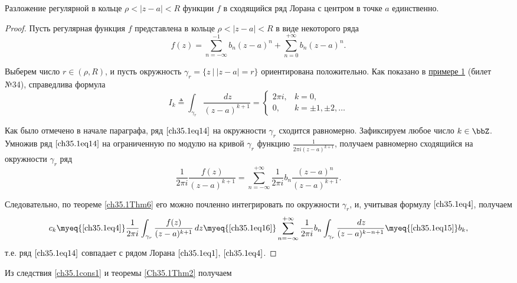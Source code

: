 \begin{thm} \label{Ch35.1Thm2}
Разложение регулярной в кольце $\rho < |z - a| < R$ функции $f$ в сходящийся ряд Лорана с центром в точке $a$ единственно.
\end{thm}

\begin{proof}
Пусть регулярная функция $f$ представлена в кольце $\rho < |z - a| < R$ в виде некоторого ряда
\begin{equation} \label{ch35.1eq14}
f(z) = \sum_{n = -\infty}^{-1} b_n (z - a)^n + \sum_{n = 0}^{+\infty} b_n (z - a)^n.
\end{equation}

Выберем число $r \in (\rho, R)$, и пусть окружность $\gamma_r = \{ z \: \big| \: |z - a| = r\}$ ориентирована положительно. Как показано в \hyperref[exmpl1]{примере 1} (билет №34), справедлива формула
\begin{equation} \label{ch35.1eq15}
I_k \triangleq \int_{\gamma_r} \frac{\,dz}{(z - a)^{k + 1}} = 
\begin{cases}
2\pi i, & k = 0, \\
0, & k = \pm1, \pm2, \ldots
\end{cases}
\end{equation}

Как было отмечено в начале параграфа, ряд $\eqref{ch35.1eq14}$ на окружности $\gamma_r$ сходится равномерно. Зафиксируем любое число $k \in \bbZ$. Умножив ряд $\eqref{ch35.1eq14}$ на ограниченную по модулю на кривой $\gamma_r$ функцию $\frac{1}{2\pi i(z - a)^{k + 1}}$, получаем равномерно сходящийся на окружности $\gamma_r$ ряд
\begin{equation} \label{ch35.1eq16}
\frac{1}{2\pi i} \frac{f(z)}{(z - a)^{k + 1}} = \sum_{n = -\infty}^{+\infty} \frac{1}{2\pi i} b_n \frac{(z-a)^n}{(z - a)^{k + 1}}.
\end{equation}

Следовательно, по теореме \ref{ch35.1Thm6} его можно почленно интегрировать по окружности $\gamma_r$, и, учитывая формулу $\eqref{ch35.1eq4}$, получаем
$$
c_k \myeq{\eqref{ch35.1eq4}} \frac{1}{2\pi i} \int_{\gamma_r} \frac{f(z)}{(z - a)^{k + 1}} \,dz \myeq{\eqref{ch35.1eq16}} \sum_{n = -\infty}^{+\infty} \frac{1}{2\pi i} b_n \int_{\gamma_r} \frac{\,dz}{(z - a)^{k - n + 1}} \myeq{\eqref{ch35.1eq15}} b_k,
$$
т.е. ряд $\eqref{ch35.1eq14}$ совпадает с рядом Лорана $\eqref{ch35.1eq1}$, $\eqref{ch35.1eq4}$.
\end{proof}

Из следствия \ref{ch35.1cons1} и теоремы \ref{Ch35.1Thm2} получаем

